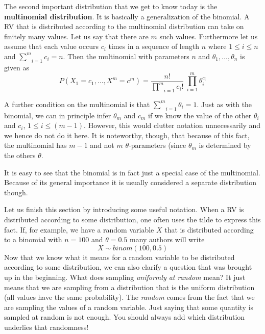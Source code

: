 \documentclass[a4paper,11pt,leqno]{report}
\begin{document}
The second important distribution that we get to know today is the \textbf{multinomial distribution}. It is basically a generalization
of the binomial. A RV that is distributed according to the multinomial distribution can take on finitely many values. Let us say that
there are $ m $ such values. Furthermore let us assume that each value occurs $ c_{i} $ times in a sequence of length $ n $ where
$ 1 \leq i \leq n $ and $ \underset{i=1}{\overset{m}{\sum}}c_{i} = n $. Then the multinomial with parameters $ n $ and 
$ \theta_{1}, \ldots, \theta_{n} $ is given as 
\begin{equation}
P(X_{1}=c_{1}, \ldots, X^{m}=c^{m}) = \dfrac{n!}{\underset{i=1}{\overset{m}{\prod}}c_{i}!}~\underset{i=1}{\overset{m}{\prod}} \theta_{i}^{c_{i}}
\end{equation}

A further condition on the multinomial is that $ \underset{i=1}{\overset{m}{\sum}}\theta_{i} = 1 $. Just as with the binomial, we can
in principle infer $ \theta_{m} $ and $ c_{m} $ if we know the value of the other $ \theta_{i} $ and $ c_{i} $, $ 1 \leq i \leq (m-1) $. However, this would
clutter notation unnecessarily and we hence do not do it here. It is noteworthy, though, that because of this fact, the multinomial
has $ m-1 $ and not $ m $ $ \theta $-parameters (since $ \theta_{m} $ is determined by the others $ \theta $.

It is easy to see that the binomial is in fact just a special case of the multinomial. Because of its general importance it is usually
considered a separate distribution though.

Let us finish this section by introducing some useful notation. When a RV is distributed according to some distribution, one often uses
the tilde to express this fact. If, for example, we have a random variable $ X $ that is distributed according to a binomial with $ n=100 $
and $ \theta = 0.5 $ many authors will write
$$ X \sim binom(100, 0.5) $$
Now that we know what it means for a random variable to be distributed according to some distribution, we can also clarify a question 
that was brought up in the beginning. What does sampling \textit{uniformly at random} mean? It just means that we are sampling from
a distribution that is the uniform distribution (all values have the same probability). The \textit{random} comes from the fact that
we are sampling the values of a random variable. Just saying that some quantity is sampled at random is not enough. You should
always add which distribution underlies that randomness!
\end{document}
